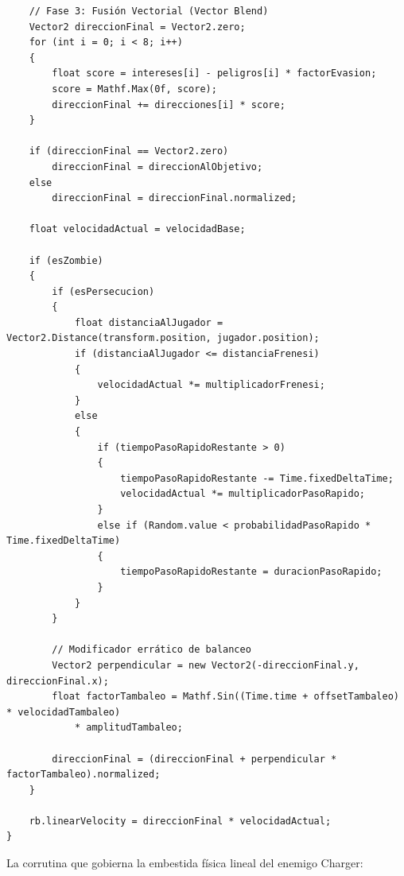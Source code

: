 \begin{verbatim}
    // Fase 3: Fusión Vectorial (Vector Blend)
    Vector2 direccionFinal = Vector2.zero;
    for (int i = 0; i < 8; i++)
    {
        float score = intereses[i] - peligros[i] * factorEvasion;
        score = Mathf.Max(0f, score);
        direccionFinal += direcciones[i] * score;
    }

    if (direccionFinal == Vector2.zero)
        direccionFinal = direccionAlObjetivo;
    else
        direccionFinal = direccionFinal.normalized;
        
    float velocidadActual = velocidadBase;

    if (esZombie)
    {
        if (esPersecucion)
        {
            float distanciaAlJugador = Vector2.Distance(transform.position, jugador.position);
            if (distanciaAlJugador <= distanciaFrenesi)
            {
                velocidadActual *= multiplicadorFrenesi;
            }
            else
            {
                if (tiempoPasoRapidoRestante > 0)
                {
                    tiempoPasoRapidoRestante -= Time.fixedDeltaTime;
                    velocidadActual *= multiplicadorPasoRapido;
                }
                else if (Random.value < probabilidadPasoRapido * Time.fixedDeltaTime)
                {
                    tiempoPasoRapidoRestante = duracionPasoRapido;
                }
            }
        }

        // Modificador errático de balanceo
        Vector2 perpendicular = new Vector2(-direccionFinal.y, direccionFinal.x);
        float factorTambaleo = Mathf.Sin((Time.time + offsetTambaleo) * velocidadTambaleo) 
            * amplitudTambaleo;
        
        direccionFinal = (direccionFinal + perpendicular * factorTambaleo).normalized;
    }

    rb.linearVelocity = direccionFinal * velocidadActual;
}
\end{verbatim}

La corrutina que gobierna la embestida física lineal del enemigo Charger:

